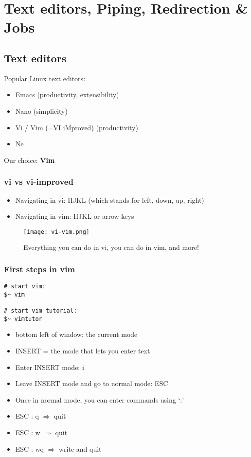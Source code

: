 \documentclass{article}
\begin{document}
\section{Text editors, Piping, Redirection \& Jobs}

\subsection{Text editors}

Popular Linux text editors:

\begin{itemize}
    \item Emacs (productivity, extensibility)
    \item Nano (simplicity)
    \item Vi / Vim (=VI iMproved) (productivity)
    \item Ne
\end{itemize}

Our choice: \textbf{Vim}

\subsubsection{vi vs vi-improved}

\begin{itemize}
    \item Navigating in vi: HJKL (which stands for left, down, up, right)
    \item Navigating in vim: HJKL or arrow keys
\end{itemize}

\begin{figure}[H]
    \centering
    \texttt{[image: vi-vim.png]}
    \caption{Everything you can do in vi, you can do in vim, and more!}
\end{figure}

\subsubsection{First steps in vim}

\begin{verbatim}
# start vim:
$~ vim

# start vim tutorial:
$~ vimtutor
\end{verbatim}

\begin{itemize}
    \item bottom left of window: the current mode
    \item INSERT = the mode that lets you enter text
    \item Enter INSERT mode: i
    \item Leave INSERT mode and go to normal mode: ESC
    \item Once in normal mode, you can enter commands using `:'
    \item ESC : q $\Rightarrow$ quit
    \item ESC : w $\Rightarrow$ quit
    \item ESC : wq $\Rightarrow$ write and quit
\end{itemize}
\end{document}
